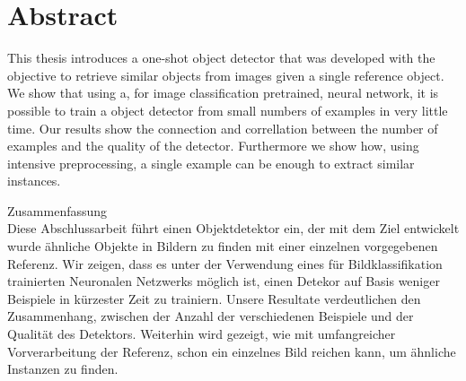 %
\chapter*{Abstract}
\label{sec:abstract}
\vspace*{-15mm}
This thesis introduces a one-shot object detector that was developed with the objective to retrieve similar objects from images given a single reference object. We show that using a, for image classification pretrained, neural network, it is possible to train a object detector from small numbers of examples in very little time. Our results show the connection and correllation between the number of examples and the quality of the detector. Furthermore we show how, using intensive preprocessing, a single example can be enough to extract similar instances.

\vspace*{20mm}

{Zusammenfassung}\label{sec:abstract-diff} \vspace*{5mm}\\
Diese Abschlussarbeit führt einen Objektdetektor ein, der mit dem Ziel entwickelt wurde ähnliche Objekte in Bildern zu finden mit einer einzelnen vorgegebenen Referenz. Wir zeigen, dass es unter der Verwendung eines für Bildklassifikation trainierten Neuronalen Netzwerks möglich ist, einen Detekor auf Basis weniger Beispiele in kürzester Zeit zu trainiern. Unsere Resultate verdeutlichen den Zusammenhang, zwischen der Anzahl der verschiedenen Beispiele und der Qualität des Detektors. Weiterhin wird gezeigt, wie mit umfangreicher Vorverarbeitung der Referenz, schon ein einzelnes Bild reichen kann, um ähnliche Instanzen zu finden.
